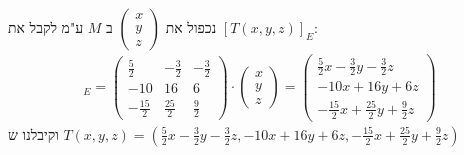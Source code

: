 \documentclass{article}
\begin{document}
	נכפול את $\begin{pmatrix}
		x \\
		y \\
		z
	\end{pmatrix}$ ב $M$ ע"מ לקבל את $[T(x,y,z)]_E$:
	\begin{align*}
		[T(x,y,z)]_E =
		\begin{pmatrix}
			\frac{5}{2} & -\frac{3}{2} & -\frac{3}{2} \\
			-10 & 16 & 6 \\
			-\frac{15}{2} & \frac{25}{2} & \frac{9}{2}
		\end{pmatrix} \cdot
		\begin{pmatrix}
			x \\
			y \\
			z
		\end{pmatrix} =
		\begin{pmatrix}
			\frac{5}{2}x - \frac{3}{2}y - \frac{3}{2}z \\
			-10x + 16y + 6z \\
			-\frac{15}{2}x + \frac{25}{2}y + \frac{9}{2}z
		\end{pmatrix}
	\end{align*}
	וקיבלנו ש $T(x,y,z) = (\frac{5}{2}x - \frac{3}{2}y - \frac{3}{2}z, -10x + 16y + 6z, -\frac{15}{2}x + \frac{25}{2}y + \frac{9}{2}z)$
\end{document}
